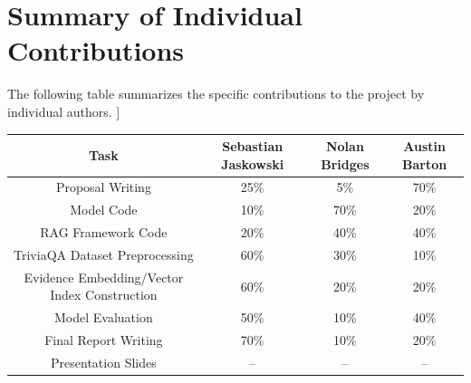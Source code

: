 \documentclass[11pt]{article}
\begin{document}
\section{Summary of Individual Contributions}
The following table summarizes the specific contributions to the project by individual authors.
\newline
]
\begin{table}[h]
    \centering
    \begin{tabular}{|c|c|c|c|} 
     \hline
     Task & Sebastian Jaskowski & Nolan Bridges & Austin Barton \\
     \hline
     \hline
     Proposal Writing  &25\% & 5\% & 70\% \\
     \hline
     Model Code & 10\% & 70\% & 20\% \\
     \hline
     RAG Framework Code & 20\% & 40\% & 40\% \\
     \hline
     TriviaQA Dataset Preprocessing & 60\% & 30\% & 10\%\\
     \hline
     Evidence Embedding/Vector Index Construction & 60\% & 20\% & 20\%\\
     \hline
     Model Evaluation & 50\% & 10\% & 40\%\\
     \hline
     Final Report Writing & 70\% & 10\% & 20\% \\
     \hline
     Presentation Slides & -- & -- & --\\
     \hline
    \end{tabular}
\end{table}
\end{document}
